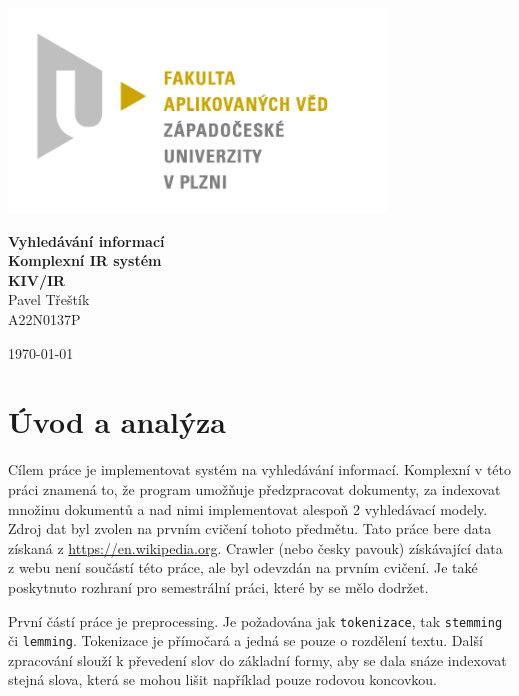 \documentclass[12pt, letterpaper]{article}
\begin{document}
\begin{titlepage}
\centerline{\includegraphics[width=10cm]{img/logo}}
\begin{center}
\vspace{30px}
{\huge
\textbf{Vyhledávání informací}\\
\textbf{Komplexní IR systém}\\
\vspace{1cm}
}
{\large
\textbf{KIV/IR}\\
\vspace{1cm}
}
\vspace{1cm}
{\large
Pavel Třeštík\\
}
{\normalsize
A22N0137P
}
\end{center}
\vspace{\fill}
\hfill
\begin{minipage}[t]{7cm}
\flushright
\today
\end{minipage}
\end{titlepage}
\section{Úvod a analýza}
Cílem práce je implementovat systém na vyhledávání informací. Komplexní v této práci znamená to, že
program umožňuje předzpracovat dokumenty, za indexovat množinu dokumentů a nad nimi implementovat alespoň 2 vyhledávací
modely. Zdroj dat byl
zvolen na prvním cvičení tohoto předmětu. Tato práce bere data získaná z \url{https://en.wikipedia.org}. Crawler
(nebo česky pavouk) získávající data z webu není součástí této práce, ale byl odevzdán na prvním cvičení. Je také
poskytnuto rozhraní pro semestrální práci, které by se mělo dodržet.

První částí práce je preprocessing. Je požadována jak \texttt{tokenizace}, tak \texttt{stemming} či \texttt{lemming}.
Tokenizace je přímočará a jedná se pouze o rozdělení textu. Další zpracování slouží k převedení slov
do základní formy, aby se dala snáze indexovat stejná slova, která se mohou lišit například pouze rodovou koncovkou.
\end{document}
